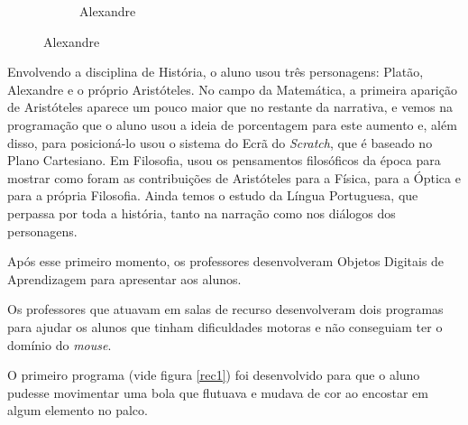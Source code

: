 \documentclass[12pt, openright, a4paper, brazil, english, french, spanish, bibjustif, openany, oneside]{abntex2}
\begin{document}
\begin{figure}[H]
\begin{subfigure}[b]{0.3\textwidth}
         \caption*{Alexandre}
         \label{alexandre}
     \end{subfigure}
     
    
\end{figure}

Envolvendo a disciplina de História, o aluno usou três personagens: Platão, Alexandre e o próprio Aristóteles. No campo da Matemática, a primeira aparição de Aristóteles aparece um pouco maior que no restante da narrativa, e vemos na programação que o aluno usou a ideia de porcentagem para este aumento e, além disso, para posicioná-lo usou o sistema do Ecrã do \textit{Scratch}, que é baseado no Plano Cartesiano. Em Filosofia, usou os pensamentos filosóficos da época para mostrar como foram as contribuições de Aristóteles para a Física, para a Óptica e para a própria Filosofia. Ainda temos o estudo da Língua Portuguesa, que perpassa por toda a história, tanto na narração como nos diálogos dos personagens. 

Após esse primeiro momento, os professores desenvolveram Objetos Digitais de Aprendizagem para apresentar aos alunos. 

Os professores que atuavam em salas de recurso desenvolveram dois programas para ajudar os alunos que tinham dificuldades motoras e não conseguiam ter o domínio do \textit{mouse}. 

O primeiro programa (vide figura \ref{rec1}) foi desenvolvido para que o aluno pudesse movimentar uma bola que flutuava e mudava de cor ao encostar em algum elemento no palco.
\end{document}

